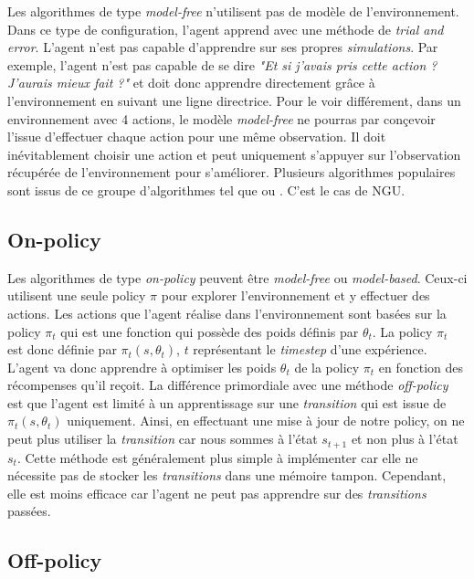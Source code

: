 Les algorithmes de type \textit{model-free} n'utilisent pas de modèle de l'environnement. Dans ce type de configuration, l'agent apprend avec une méthode de \textit{trial and error}. L'agent n'est pas capable d'apprendre sur ses propres \textit{simulations}. Par exemple, l'agent n'est pas capable de se dire \textit{"Et si j'avais pris cette action ? J'aurais mieux fait ?"} et doit donc apprendre directement grâce à l'environnement en suivant une ligne directrice. Pour le voir différement, dans un environnement avec 4 actions, le modèle \textit{model-free} ne pourras par conçevoir l'issue d'effectuer chaque action pour une même observation. Il doit inévitablement choisir une action et peut uniquement s'appuyer sur l'observation récupérée de l'environnement pour s'améliorer. Plusieurs algorithmes populaires sont issus de ce groupe d'algorithmes tel que  ou . C'est le cas de NGU.

\subsection{On-policy}

Les algorithmes de type \textit{on-policy} peuvent être \textit{model-free} ou \textit{model-based}. Ceux-ci utilisent une seule policy $\pi$ pour explorer l'environnement et y effectuer des actions. Les actions que l'agent réalise dans l'environnement sont basées sur la policy $\pi_t$ qui est une fonction qui possède des poids définis par $\theta_t$. La policy $\pi_t$ est donc définie par $\pi_t(s, \theta_t)$, $t$ représentant le \textit{timestep} d'une expérience. L'agent va donc apprendre à optimiser les poids $\theta_t$ de la policy $\pi_t$ en fonction des récompenses qu'il reçoit. La différence primordiale avec une méthode \textit{off-policy} est que l'agent est limité à un apprentissage sur une \textit{transition} qui est issue de $\pi_t(s, \theta_t)$ uniquement. Ainsi, en effectuant une mise à jour de notre policy, on ne peut plus utiliser la \textit{transition} car nous sommes à l'état $s_{t+1}$ et non plus à l'état $s_t$. Cette méthode est généralement plus simple à implémenter car elle ne nécessite pas de stocker les \textit{transitions} dans une mémoire tampon. Cependant, elle est moins efficace car l'agent ne peut pas apprendre sur des \textit{transitions} passées.

\subsection{Off-policy}


